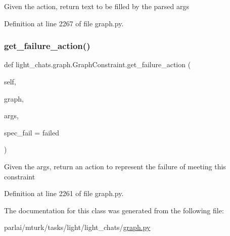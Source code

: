 \begin{DoxyVerb}Given the action, return text to be filled by the parsed args\end{DoxyVerb}
 

Definition at line 2267 of file graph.\+py.

\mbox{\label{classlight__chats_1_1graph_1_1GraphConstraint_ac824a43559c367bf625f79559f026c6b}} 
\subsubsection{\texorpdfstring{get\+\_\+failure\+\_\+action()}{get\_failure\_action()}}
{\footnotesize\ttfamily def light\+\_\+chats.\+graph.\+Graph\+Constraint.\+get\+\_\+failure\+\_\+action (\begin{DoxyParamCaption}\item[{}]{self,  }\item[{}]{graph,  }\item[{}]{args,  }\item[{}]{spec\+\_\+fail = {\ttfamily \textquotesingle{}failed\textquotesingle{}} }\end{DoxyParamCaption})}

\begin{DoxyVerb}Given the args, return an action to represent the failure of
meeting this constraint
\end{DoxyVerb}
 

Definition at line 2261 of file graph.\+py.



The documentation for this class was generated from the following file\+:\begin{DoxyCompactItemize}
\item 
parlai/mturk/tasks/light/light\+\_\+chats/\hyperlink{parlai_2mturk_2tasks_2light_2light__chats_2graph_8py}{graph.\+py}\end{DoxyCompactItemize}
